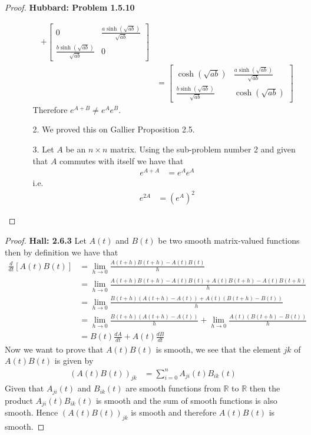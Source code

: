 \documentclass[11pt]{article}
\newcommand{\R}{\mathbb{R}}
\theoremstyle{definition}
\begin{document}
\begin{proof}{\textbf{Hubbard: Problem 1.5.10}}
\begin{itemize}
\begin{itemize}
\begin{align*}
            + \begin{bmatrix} 0 & \frac{a\sinh(\sqrt{ab})}{\sqrt{ab}}\\
            \frac{b\sinh(\sqrt{ab})}{\sqrt{ab}} & 0 \end{bmatrix}\\
            &= \begin{bmatrix} \cosh(\sqrt{ab}) & \frac{a\sinh(\sqrt{ab})}{\sqrt{ab}}\\
            \frac{b\sinh(\sqrt{ab})}{\sqrt{ab}} & \cosh(\sqrt{ab}) \end{bmatrix}
        \end{align*}
        Therefore $e^{A + B} \neq e^Ae^B$.
        \item [2.] We proved this on Gallier Proposition 2.5. 
        \item [3.] Let $A$ be an $n \times n$ matrix. Using the sub-problem
        number 2 and given that $A$ commutes with itself we have that
        \begin{align*}
            e^{A + A} &= e^Ae^A
        \end{align*}
        i.e.
        \begin{align*}
            e^{2A} &= (e^A)^2
        \end{align*}
    \end{itemize}
\end{itemize}
\end{proof}
\cleardoublepage
\begin{proof}{\textbf{Hall: 2.6.3}}
    Let $A(t)$ and $B(t)$ be two smooth matrix-valued functions then by
    definition we have that
    \begin{align*}
        \frac{d}{dt}[A(t)B(t)] &= \lim_{h\to 0}\frac{A(t+h)B(t+h) - A(t)B(t)}{h}\\
            &= \lim_{h\to 0}\frac{A(t+h)B(t+h) - A(t)B(t) + A(t)B(t+h) - A(t)B(t+h)}{h}\\
            &= \lim_{h\to 0}\frac{B(t+h)(A(t+h) - A(t)) + A(t)(B(t+h) - B(t))}{h}\\
            &= \lim_{h\to 0}\frac{B(t+h)(A(t+h) - A(t))}{h}
            + \lim_{h\to 0}\frac{A(t)(B(t+h) - B(t))}{h}\\
            &= B(t)\frac{dA}{dt} + A(t)\frac{dB}{dt}
    \end{align*}
    Now we want to prove that $A(t)B(t)$ is smooth, we see that the element
    $jk$ of $A(t)B(t)$ is given by
    \begin{align*}
        (A(t)B(t))_{jk} &= \sum_{i=0}^n A_{ji}(t)B_{ik}(t)
    \end{align*}
    Given that $A_{ji}(t)$ and $B_{ik}(t)$ are smooth functions from $\R$ to
    $\R$ then the product $A_{ji}(t)B_{ik}(t)$ is smooth and the sum of smooth
    functions is also smooth. Hence $(A(t)B(t))_{jk}$ is smooth and therefore
    $A(t)B(t)$ is smooth. 
\end{proof}
\end{document}
